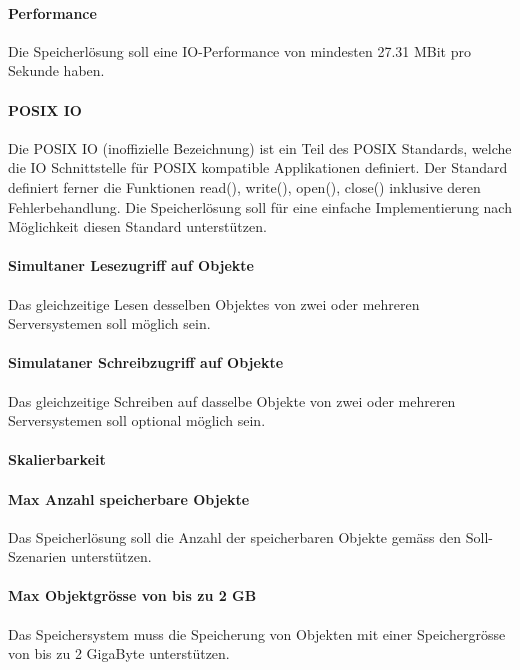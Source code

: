 \paragraph{Performance}\label{Soll-3-2}
Die Speicherlösung soll eine IO-Performance von mindesten 27.31 MBit pro Sekunde haben.

\paragraph{POSIX IO}\label{Soll-3-3}
Die POSIX IO (inoffizielle Bezeichnung) ist ein Teil des POSIX Standards, welche die IO Schnittstelle für POSIX kompatible Applikationen definiert. Der Standard definiert ferner die Funktionen read(), write(), open(), close() inklusive deren Fehlerbehandlung. Die Speicherlösung soll für eine einfache Implementierung nach Möglichkeit diesen Standard unterstützen. 

\paragraph{Simultaner Lesezugriff auf Objekte}\label{Soll-3-4}
Das gleichzeitige Lesen desselben Objektes von zwei oder mehreren Serversystemen soll möglich sein.

\paragraph{Simulataner Schreibzugriff auf Objekte}\label{Soll-3-5}
Das gleichzeitige Schreiben auf dasselbe Objekte von zwei oder mehreren Serversystemen soll optional möglich sein.

\setcounter{paragraph}{0}
\renewcommand\theparagraph{Soll-4-\arabic{paragraph}}

\paragraph{Skalierbarkeit}\label{Soll-4-1}

\paragraph{Max Anzahl speicherbare Objekte}\label{Soll-4-2}
Das Speicherlösung soll die Anzahl der speicherbaren Objekte gemäss den Soll-Szenarien unterstützen. 

\paragraph{Max Objektgrösse von bis zu 2 GB}\label{Soll-4-3}
Das Speichersystem muss die Speicherung von Objekten mit einer Speichergrösse von bis zu 2 GigaByte unterstützen.

